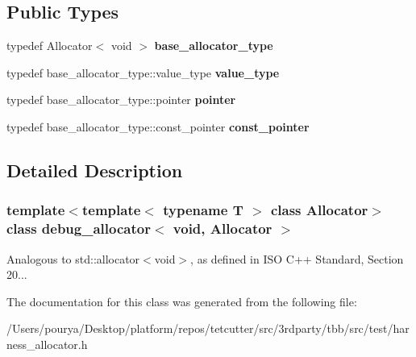 \subsection*{Public Types}
\begin{DoxyCompactItemize}
\item 
\hypertarget{classdebug__allocator_3_01void_00_01Allocator_01_4_ac0b39ac51364ec5fc2af08d2f5f76d26}{}typedef Allocator$<$ void $>$ {\bfseries base\+\_\+allocator\+\_\+type}\label{classdebug__allocator_3_01void_00_01Allocator_01_4_ac0b39ac51364ec5fc2af08d2f5f76d26}

\item 
\hypertarget{classdebug__allocator_3_01void_00_01Allocator_01_4_ac4ddd8219d9fdde02fa1649f7f71da9b}{}typedef base\+\_\+allocator\+\_\+type\+::value\+\_\+type {\bfseries value\+\_\+type}\label{classdebug__allocator_3_01void_00_01Allocator_01_4_ac4ddd8219d9fdde02fa1649f7f71da9b}

\item 
\hypertarget{classdebug__allocator_3_01void_00_01Allocator_01_4_ab375acd9860d46d6d36dc23b4ccd3414}{}typedef base\+\_\+allocator\+\_\+type\+::pointer {\bfseries pointer}\label{classdebug__allocator_3_01void_00_01Allocator_01_4_ab375acd9860d46d6d36dc23b4ccd3414}

\item 
\hypertarget{classdebug__allocator_3_01void_00_01Allocator_01_4_ae46b6a583477d57eaebeacdb66fcbba5}{}typedef base\+\_\+allocator\+\_\+type\+::const\+\_\+pointer {\bfseries const\+\_\+pointer}\label{classdebug__allocator_3_01void_00_01Allocator_01_4_ae46b6a583477d57eaebeacdb66fcbba5}

\end{DoxyCompactItemize}


\subsection{Detailed Description}
\subsubsection*{template$<$template$<$ typename T $>$ class Allocator$>$class debug\+\_\+allocator$<$ void, Allocator $>$}

Analogous to std\+::allocator$<$void$>$, as defined in I\+S\+O C++ Standard, Section 20... 



The documentation for this class was generated from the following file\+:\begin{DoxyCompactItemize}
\item 
/\+Users/pourya/\+Desktop/platform/repos/tetcutter/src/3rdparty/tbb/src/test/harness\+\_\+allocator.\+h\end{DoxyCompactItemize}
